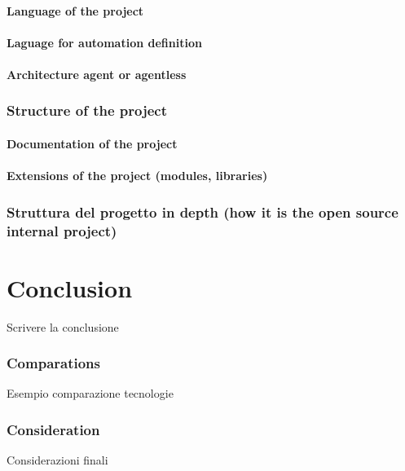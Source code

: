 \documentclass[12pt,a4paper,openright,twoside]{book}
\begin{document}
\subsubsection{Language of the project}
\subsubsection{Laguage for automation definition}
\subsubsection{Architecture agent or agentless}

\subsection{Structure of the project}
\subsubsection{Documentation of the project}
\subsubsection{Extensions of the project (modules, libraries)}

\subsection{Struttura del progetto in depth (how it is the open source internal project)}





\chapter{Conclusion}
Scrivere la conclusione

\subsection{Comparations}
Esempio comparazione tecnologie

\subsection{Consideration}
Considerazioni finali


\end{document}
